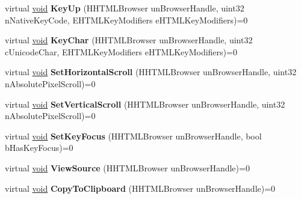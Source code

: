 \begin{DoxyCompactItemize}
\item 
\hypertarget{classISteamHTMLSurface_a6c7a4a2faf6a4d1938fc58af0368d99f}{}virtual \hyperlink{SDL__audio_8h_a52835ae37c4bb905b903cbaf5d04b05f}{void} {\bfseries Key\+Up} (H\+H\+T\+M\+L\+Browser un\+Browser\+Handle, uint32 n\+Native\+Key\+Code, E\+H\+T\+M\+L\+Key\+Modifiers e\+H\+T\+M\+L\+Key\+Modifiers)=0\label{classISteamHTMLSurface_a6c7a4a2faf6a4d1938fc58af0368d99f}

\item 
\hypertarget{classISteamHTMLSurface_aa93de957632e7fd281294013eee63639}{}virtual \hyperlink{SDL__audio_8h_a52835ae37c4bb905b903cbaf5d04b05f}{void} {\bfseries Key\+Char} (H\+H\+T\+M\+L\+Browser un\+Browser\+Handle, uint32 c\+Unicode\+Char, E\+H\+T\+M\+L\+Key\+Modifiers e\+H\+T\+M\+L\+Key\+Modifiers)=0\label{classISteamHTMLSurface_aa93de957632e7fd281294013eee63639}

\item 
\hypertarget{classISteamHTMLSurface_a4c8950ae7f524118fbde433c77339594}{}virtual \hyperlink{SDL__audio_8h_a52835ae37c4bb905b903cbaf5d04b05f}{void} {\bfseries Set\+Horizontal\+Scroll} (H\+H\+T\+M\+L\+Browser un\+Browser\+Handle, uint32 n\+Absolute\+Pixel\+Scroll)=0\label{classISteamHTMLSurface_a4c8950ae7f524118fbde433c77339594}

\item 
\hypertarget{classISteamHTMLSurface_a7f15a9fb1e164b74554c1a1800dde128}{}virtual \hyperlink{SDL__audio_8h_a52835ae37c4bb905b903cbaf5d04b05f}{void} {\bfseries Set\+Vertical\+Scroll} (H\+H\+T\+M\+L\+Browser un\+Browser\+Handle, uint32 n\+Absolute\+Pixel\+Scroll)=0\label{classISteamHTMLSurface_a7f15a9fb1e164b74554c1a1800dde128}

\item 
\hypertarget{classISteamHTMLSurface_a4c3734b512aad5b5c992bfc37368ffa5}{}virtual \hyperlink{SDL__audio_8h_a52835ae37c4bb905b903cbaf5d04b05f}{void} {\bfseries Set\+Key\+Focus} (H\+H\+T\+M\+L\+Browser un\+Browser\+Handle, bool b\+Has\+Key\+Focus)=0\label{classISteamHTMLSurface_a4c3734b512aad5b5c992bfc37368ffa5}

\item 
\hypertarget{classISteamHTMLSurface_a2368589678c2f2d510bab360169a77a5}{}virtual \hyperlink{SDL__audio_8h_a52835ae37c4bb905b903cbaf5d04b05f}{void} {\bfseries View\+Source} (H\+H\+T\+M\+L\+Browser un\+Browser\+Handle)=0\label{classISteamHTMLSurface_a2368589678c2f2d510bab360169a77a5}

\item 
\hypertarget{classISteamHTMLSurface_a8880e87740ef539e588535dfc54b2e8b}{}virtual \hyperlink{SDL__audio_8h_a52835ae37c4bb905b903cbaf5d04b05f}{void} {\bfseries Copy\+To\+Clipboard} (H\+H\+T\+M\+L\+Browser un\+Browser\+Handle)=0\label{classISteamHTMLSurface_a8880e87740ef539e588535dfc54b2e8b}


\end{DoxyCompactItemize}
